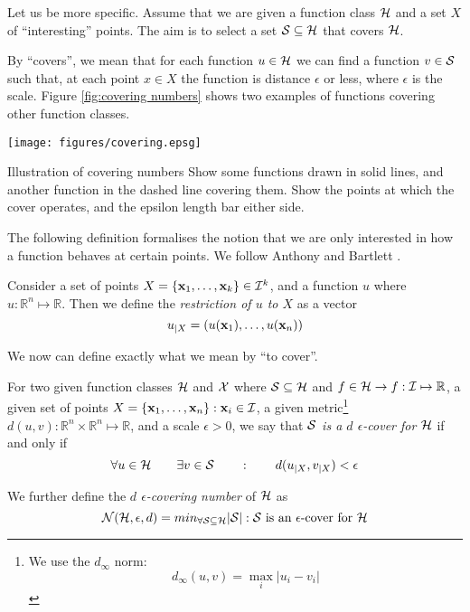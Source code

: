Let us be more specific.  Assume that we are given a function class
$\mathcal{H}$ and a set $X$ of ``interesting'' points.  The aim is to select
a set $\mathcal{S} \subseteq \mathcal{H}$ that covers $\mathcal{H}$.

By ``covers'', we  mean that for each function $u \in \mathcal{H}$ we can
find a function $v \in \mathcal{S}$ such that, at each point $x \in X$ the
function is distance $\epsilon$ or less, where $\epsilon$ is the
scale.  Figure \ref{fig:covering numbers} shows two examples of
functions covering other function classes.

\begin{linefigure}
\begin{center}
\texttt{[image: figures/covering.epsg]}
\end{center}
\begin{capt}{Illustration of covering numbers}
Show some functions drawn in solid lines, and another function in the
dashed line covering them.  Show the points at which the cover
operates, and the epsilon length bar either side.
\end{capt}
\end{linefigure}

The following definition formalises the notion that we are only
interested in how a function behaves at certain points.  We follow
Anthony and Bartlett \cite{Anthony98}.

\begin{definition}
\label{def:restriction}
Consider a set of points $X = \{\mathbf{x}_1, \ldots, \mathbf{x}_k\} \in \mathcal{I}^k$,
and a function $u$ where $u : \mathbb{R}^n \mapsto \mathbb{R}$.  Then
we define the \emph{restriction of $u$ to $X$} as a vector
%
\begin{equation}
u_{|X} = (u(\mathbf{x}_1), \ldots, u(\mathbf{x}_n))
\end{equation}
\end{definition}

We now can define exactly what we mean by ``to cover''.

\begin{definition}
\label{def:covering}
\label{def:covering numbers}
For two given function classes $\mathcal{H}$ and $\mathcal{X}$ where $\mathcal{S}
\subseteq \mathcal{H}$ and $f \in \mathcal{H} \rightarrow f : \mathcal{I} \mapsto
\mathbb{R}$, a given set of points $X = \{\mathbf{x}_1, \ldots, \mathbf{x}_n\} : \mathbf{x}_i \in
\mathcal{I}$, a given metric\footnote{We use the $d_{\infty}$ norm: 
\[ d_{\infty}(u, v) = \max_{i} |u_i - v_i| \]} $d(u, v) : \mathbb{R}^n
\times \mathbb{R}^n \mapsto 
\mathbb{R}$, and a scale $\epsilon > 0$, we say that \emph{$\mathcal{S}$ is a
$d$ $\epsilon$-cover for $\mathcal{H}$} if and only if
\begin{equation}
\forall u \in \mathcal{H} \qquad \exists v \in \mathcal{S} \qquad : \qquad
d(u_{|X}, v_{|X}) < \epsilon
\end{equation}

We further define the \emph{$d$ $\epsilon$-covering number} of $\mathcal{H}$
as 
\begin{equation}
\mathcal{N}({\mathcal{H}}, {\epsilon}, {d}) = min_{\forall \mathcal{S} \subseteq
\mathcal{H}}|\mathcal{S}| : \mbox{$\mathcal{S}$ is an $\epsilon$-cover for $\mathcal{H}$}
\end{equation}
\end{definition}

